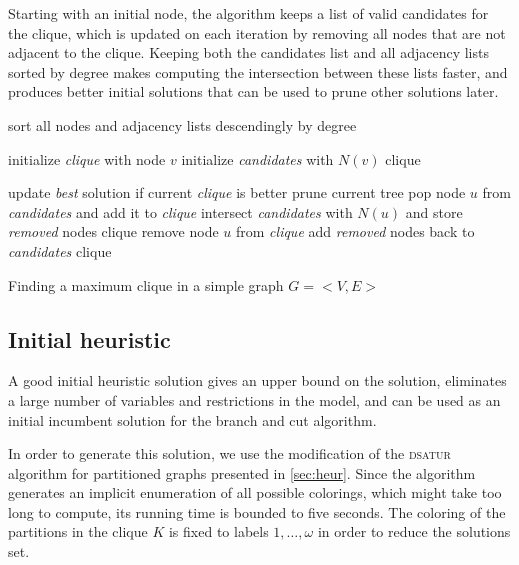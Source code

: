 Starting with an initial node, the algorithm keeps a list of valid candidates for the clique, which is updated on each iteration by removing all nodes that are not adjacent to the clique. Keeping both the candidates list and all adjacency lists sorted by degree makes computing the intersection between these lists faster, and produces better initial solutions that can be used to prune other solutions later.

\begin{algorithm}

\begin{algorithmic}

\STATE sort all nodes and adjacency lists descendingly by degree

	\STATE initialize \textit{clique} with node $v$
	\STATE initialize \textit{candidates} with $N(v)$
	\CALL clique 
\ENDFOR

		\STATE update \textit{best} solution if current \textit{clique} is better
		\STATE prune current tree
	\ELSE
		\STATE pop node $u$ from \textit{candidates} and add it to \textit{clique}
		\STATE intersect \textit{candidates} with $N(u)$ and store \textit{removed} nodes
		\CALL clique
		\STATE remove node $u$ from \textit{clique}
		\STATE add \textit{removed} nodes back to \textit{candidates} 
		\CALL clique
	\ENDIF
\ENDPROC

\end{algorithmic}

\caption{Finding a maximum clique in a simple graph $G=<V,E>$}
\label{alg:gpclique}

\end{algorithm} 

\subsection{Initial heuristic}

A good initial heuristic solution gives an upper bound on the solution, eliminates a large number of variables and restrictions in the model, and can be used as an initial incumbent solution for the branch and cut algorithm. 

In order to generate this solution, we use the modification of the \textsc{dsatur} algorithm for partitioned graphs presented in \ref{sec:heur}. Since the algorithm generates an implicit enumeration of all possible colorings, which might take too long to compute, its running time is bounded to five seconds. The coloring of the partitions in the clique $K$ is fixed to labels $1, \ldots, \omega$ in order to reduce the solutions set.


